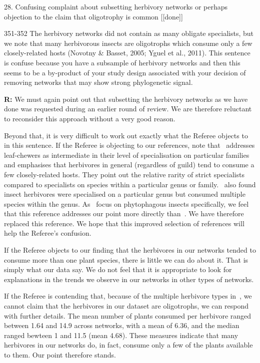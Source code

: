 \documentclass[12pt]{letter}
\newenvironment{refquote}{\bigskip \begin{it}}{\end{it}\smallskip}
\begin{document}
	28. Confusing complaint about subsetting herbivory networks or perhaps objection to the claim that oligotrophy is common [[done]]

		\begin{refquote}
			351-352 The herbivory networks did not contain as many obligate specialists, but we note that many herbivorous insects are oligotrophs which consume only a few closely-related hosts (Novotny \& Basset, 2005; Yguel et al., 2011). This sentence is confuse because you have a subsample of herbivory networks and then this seems to be a by-product of your study design associated with your decision of removing networks that may show strong phylogenetic signal.
		\end{refquote}


		\textbf{R:} We must again point out that subsetting the herbivory networks as we have done was requested during an earlier round of review. We are therefore reluctant to reconsider this approach without a very good reason. 


		Beyond that, it is very difficult to work out exactly what the Referee objects to in this sentence. If the Referee is objecting to our references, note that~\citet{Novotny2005} addresses leaf-chewers as intermediate in their level of specialisation on particular families and emphasises that herbivores in general (regardless of guild) tend to consume a few closely-related hosts. They point out the relative rarity of strict specialists compared to specialists on species within a particular genus or family.~\citet{Brandle2006} also found insect herbivores were specialised on a particular genus but consumed multiple species within the genus. As~\citet{Brandle2006} focus on phytophagous insects specifically, we feel that this reference addresses our point more directly than~\citet{Yguel2011}. We have therefore replaced this reference. We hope that this improved selection of references will help the Referee's confusion.


		If the Referee objects to our finding that the herbivores in our networks tended to consume more than one plant species, there is little we can do about it. That is simply what our data say. We do not feel that it is appropriate to look for explanations in the trends we observe in our networks in other types of networks. 


		If the Referee is contending that, because of the multiple herbivore types in~\citet{Novotny2005}, we cannot claim that the herbivores in our dataset are oligotrophs, we can respond with further details. The mean number of plants consumed per herbivore ranged between 1.64 and 14.9 across networks, with a mean of 6.36, and the median ranged bewteen 1 and 11.5 (mean 4.68). These measures indicate that many herbivores in our networks do, in fact, consume only a few of the plants available to them. Our point therefore stands.
\end{document}
